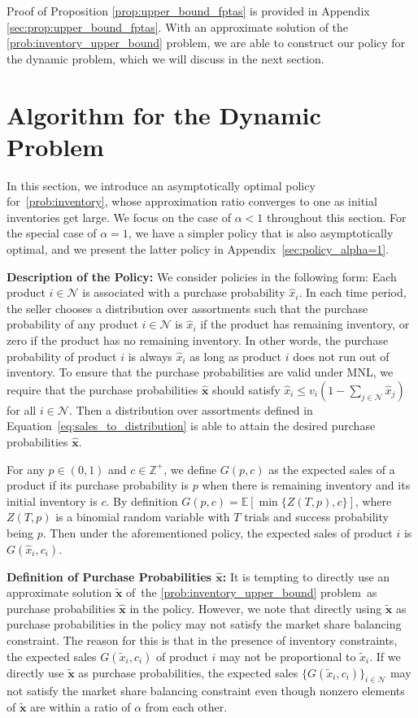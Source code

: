 \documentclass[mnsc,non-blindrev]{informs3}
\theoremstyle{definition}
\begin{document}
Proof of Proposition \ref{prop:upper_bound_fptas} is provided in Appendix \ref{sec:prop:upper_bound_fptas}. With an approximate solution of the \ref{prob:inventory_upper_bound} problem, we are able to construct our policy for the dynamic problem, which we will discuss in the next section.


\section{Algorithm for the Dynamic Problem}\label{sec:dynamic_inventory}

In this section, we introduce an asymptotically optimal policy for~\ref{prob:inventory}, whose approximation ratio converges to one as initial inventories get large. We focus on the case of $\alpha<1$ throughout this section. For the special case of $\alpha=1$, we have a simpler policy that is also asymptotically optimal, and we present the latter policy in Appendix~\ref{sec:policy_alpha=1}.

\noindent\textbf{Description of the Policy:} We consider policies in the following form: Each product $i\in\mathcal{N}$ is associated with a purchase probability $\hat{x}_i$. In each time period, the seller chooses a distribution over assortments such that the purchase probability of any product $i\in\mathcal{N}$ is $\hat{x}_i$ if the product has remaining inventory, or zero if the product has no remaining inventory. In other words, the purchase probability of product $i$ is always $\hat{x}_i$ as long as product $i$ does not run out of inventory. To ensure that the purchase probabilities are valid under MNL, we require that the purchase probabilities $\hat{\bm{x}}$ should satisfy $\hat{x}_i\leq v_i(1-\sum_{j\in\mathcal{N}}\hat{x}_j)$ for all $i\in\mathcal{N}$. Then a distribution over assortments defined in Equation~\eqref{eq:sales_to_distribution} is able to attain the desired purchase probabilities $\hat{\bm{x}}$.

For any $p\in(0,1)$ and $c\in\mathbb{Z}^+$, we define $G(p,c)$ as the expected sales of a product if its purchase probability is $p$ when there is remaining inventory and its initial inventory is $c$. By definition $G(p,c)=\mathbb{E}[\min\{Z(T,p),c\}]$, where $Z(T,p)$ is a binomial random variable with $T$ trials and success probability being $p$. Then under the aforementioned policy, the expected sales of product $i$ is $G(\hat{x}_i,c_i)$.

\noindent\textbf{Definition of Purchase Probabilities $\hat{\bm{x}}$:} It is tempting to directly use an approximate solution $\tilde{\bm{x}}$ of~the \ref{prob:inventory_upper_bound} problem~as purchase probabilities $\hat{\bm{x}}$ in the policy. However, we note that directly using $\tilde{\bm{x}}$ as purchase probabilities in the policy may not satisfy the market share balancing constraint. The reason for this is that in the presence of inventory constraints, the expected sales $G(\tilde{x}_i,c_i)$ of product $i$ may not be proportional to $\tilde{x}_i$. If we directly use $\tilde{\bm{x}}$ as purchase probabilities, the expected sales $\{G(\tilde{x}_i,c_i)\}_{i\in\mathcal{N}}$ may not satisfy the market share balancing constraint even though nonzero elements of $\tilde{\bm{x}}$ are within a ratio of $\alpha$ from each other.
\end{document}
